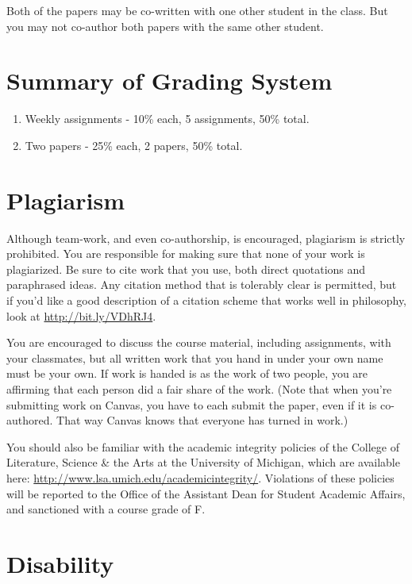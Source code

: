 \documentclass[
]{article}
\providecommand{\tightlist}{%
  \setlength{\itemsep}{0pt}\setlength{\parskip}{0pt}}
\begin{document}
Both of the papers may be co-written with one other student in the
class. But you may not co-author both papers with the same other
student.

\hypertarget{summary-of-grading-system}{%
\section{Summary of Grading System}\label{summary-of-grading-system}}

\begin{enumerate}
\def\labelenumi{\arabic{enumi}.}
\tightlist
\item
  Weekly assignments - 10\% each, 5 assignments, 50\% total.
\item
  Two papers - 25\% each, 2 papers, 50\% total.
\end{enumerate}

\hypertarget{plagiarism}{%
\section{Plagiarism}\label{plagiarism}}

Although team-work, and even co-authorship, is encouraged, plagiarism is
strictly prohibited. You are responsible for making sure that none of
your work is plagiarized. Be sure to cite work that you use, both direct
quotations and paraphrased ideas. Any citation method that is tolerably
clear is permitted, but if you'd like a good description of a citation
scheme that works well in philosophy, look at
\url{http://bit.ly/VDhRJ4}.

You are encouraged to discuss the course material, including
assignments, with your classmates, but all written work that you hand in
under your own name must be your own. If work is handed is as the work
of two people, you are affirming that each person did a fair share of
the work. (Note that when you're submitting work on Canvas, you have to
each submit the paper, even if it is co-authored. That way Canvas knows
that everyone has turned in work.)

You should also be familiar with the academic integrity policies of the
College of Literature, Science \& the Arts at the University of
Michigan, which are available here:
\url{http://www.lsa.umich.edu/academicintegrity/}. Violations of these
policies will be reported to the Office of the Assistant Dean for
Student Academic Affairs, and sanctioned with a course grade of F.

\newpage

\hypertarget{disability}{%
\section{Disability}\label{disability}}
\end{document}
